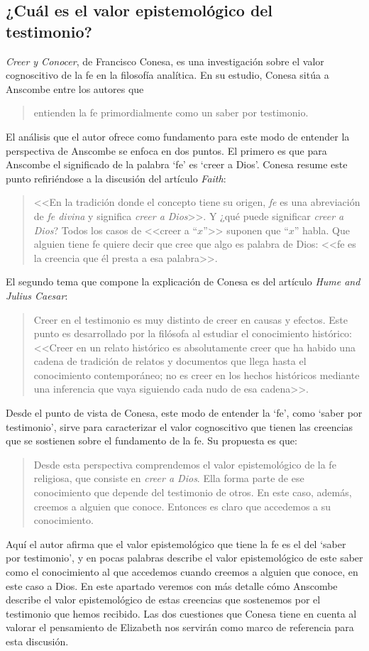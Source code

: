 \subsection{¿Cuál es el valor epistemológico del testimonio?}

\emph{Creer y Conocer}, de Francisco Conesa, es una investigación sobre el valor cognoscitivo de la fe en la filosofía analítica. En su estudio, Conesa sitúa a Anscombe entre los autores que \blockquote[{\cite[84]{conesa1994cc}}]{entienden la fe primordialmente como un saber por testimonio.} El análisis que el autor ofrece como fundamento para este modo de entender la perspectiva de Anscombe se enfoca en dos puntos. El primero es que para Anscombe el significado de la palabra `fe' es `creer a Dios'. Conesa resume este punto refiriéndose a la discusión del artículo \emph{Faith}: \blockquote[{\cite[87--88]{conesa1994cc}}]{<<En la tradición donde el concepto tiene su origen, \emph{fe} es una abreviación de \emph{fe divina} y significa \emph{creer a Dios}>>. Y ¿qué puede significar \emph{creer a Dios}? Todos los casos de <<creer a ``$x$''>> suponen que ``$x$'' habla. Que alguien tiene fe quiere decir que cree que algo es palabra de Dios: <<fe es la creencia que él presta a esa palabra>>.} El segundo tema que compone la explicación de Conesa es del artículo \emph{Hume and Julius Caesar}: \blockquote[{\cite[88]{conesa1994cc}}]{Creer en el testimonio es muy distinto de creer en causas y efectos. Este punto es desarrollado por la filósofa al estudiar el conocimiento histórico: <<Creer en un relato histórico es absolutamente creer que ha habido una cadena de tradición de relatos y documentos que llega hasta el conocimiento contemporáneo; no es creer en los hechos históricos mediante una inferencia que vaya siguiendo cada nudo de esa cadena>>.}

Desde el punto de vista de Conesa, este modo de entender la `fe', como `saber por testimonio', sirve para caracterizar el valor cognoscitivo que tienen las creencias que se sostienen sobre el fundamento de la fe. Su propuesta es que: \blockquote[{\cite[88]{conesa1994cc}}]{Desde esta perspectiva comprendemos el valor epistemológico de la fe religiosa, que consiste en \emph{creer a Dios}. Ella forma parte de ese conocimiento que depende del testimonio de otros. En este caso, además, creemos a alguien que conoce. Entonces es claro que accedemos a su conocimiento.} Aquí el autor afirma que el valor epistemológico que tiene la fe es el del `saber por testimonio', y en pocas palabras describe el valor epistemológico de este saber como el conocimiento al que accedemos cuando creemos a alguien que conoce, en este caso a Dios. En este apartado veremos con más detalle cómo Anscombe describe el valor epistemológico de estas creencias que sostenemos por el testimonio que hemos recibido. Las dos cuestiones que Conesa tiene en cuenta al valorar el pensamiento de Elizabeth nos servirán como marco de referencia para esta discusión.

